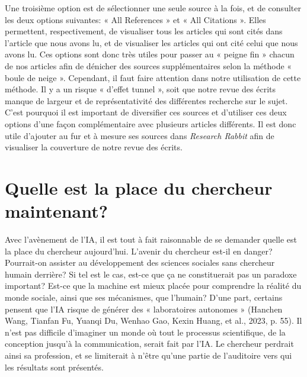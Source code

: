 \documentclass[
  letterpaper,
  DIV=11,
  numbers=noendperiod]{scrreprt}
\begin{document}
Une troisième option est de sélectionner une seule source à la fois, et
de consulter les deux options suivantes: « All References » et « All
Citations ». Elles permettent, respectivement, de visualiser tous les
articles qui sont cités dans l'article que nous avons lu, et de
visualiser les articles qui ont cité celui que nous avons lu. Ces
options sont donc très utiles pour passer au « peigne fin » chacun de
nos articles afin de dénicher des sources supplémentaires selon la
méthode « boule de neige ». Cependant, il faut faire attention dans
notre utilisation de cette méthode. Il y a un risque « d'effet tunnel »,
soit que notre revue des écrits manque de largeur et de représentativité
des différentes recherche sur le sujet. C'est pourquoi il est important
de diversifier ces sources et d'utiliser ces deux options d'une façon
complémentaire avec plusieurs articles différents. Il est donc utile
d'ajouter au fur et à mesure ses sources dans \emph{Research Rabbit}
afin de visualiser la couverture de notre revue des écrits.

\section{Quelle est la place du chercheur
maintenant?}\label{quelle-est-la-place-du-chercheur-maintenant}

Avec l'avènement de l'IA, il est tout à fait raisonnable de se demander
quelle est la place du chercheur aujourd'hui. L'avenir du chercheur
est-il en danger? Pourrait-on assister au développement des sciences
sociales sans chercheur humain derrière? Si tel est le cas, est-ce que
ça ne constituerait pas un paradoxe important? Est-ce que la machine est
mieux placée pour comprendre la réalité du monde sociale, ainsi que ses
mécanismes, que l'humain? D'une part, certains pensent que l'IA risque
de générer des « laboratoires autonomes » (Hanchen Wang, Tianfan Fu,
Yuanqi Du, Wenhao Gao, Kexin Huang, et al., 2023, p. 55). Il n'est pas
difficile d'imaginer un monde où tout le processus scientifique, de la
conception jusqu'à la communication, serait fait par l'IA. Le chercheur
perdrait ainsi sa profession, et se limiterait à n'être qu'une partie de
l'auditoire vers qui les résultats sont présentés.
\end{document}
